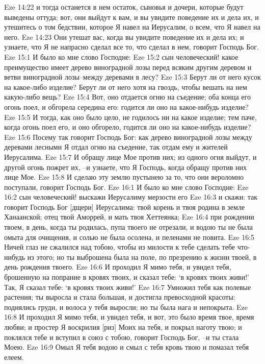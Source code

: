 Eze 14:22  и тогда останется в нем остаток, сыновья и дочери, которые будут выведены оттуда; вот, они выйдут к вам, и вы увидите поведение их и дела их, и утешитесь о том бедствии, которое Я навел на Иерусалим, о всем, что Я навел на него.
Eze 14:23  Они утешат вас, когда вы увидите поведение их и дела их; и узнаете, что Я не напрасно сделал все то, что сделал в нем, говорит Господь Бог.
Eze 15:1  И было ко мне слово Господне:
Eze 15:2  сын человеческий! какое преимущество имеет дерево виноградной лозы перед всяким другим деревом и ветви виноградной лозы--между деревами в лесу?
Eze 15:3  Берут ли от него кусок на какое-либо изделие? Берут ли от него хотя на гвоздь, чтобы вешать на нем какую-либо вещь?
Eze 15:4  Вот, оно отдается огню на съедение; оба конца его огонь поел, и обгорела середина его: годится ли оно на какое-нибудь изделие?
Eze 15:5  И тогда, как оно было цело, не годилось ни на какое изделие; тем паче, когда огонь поел его, и оно обгорело, годится ли оно на какое-нибудь изделие?
Eze 15:6  Посему так говорит Господь Бог: как дерево виноградной лозы между деревами лесными Я отдал огню на съедение, так отдам ему и жителей Иерусалима.
Eze 15:7  И обращу лице Мое против них; из одного огня выйдут, и другой огонь пожрет их, --и узнаете, что Я Господь, когда обращу против них лице Мое.
Eze 15:8  И сделаю эту землю пустынею за то, что они вероломно поступали, говорит Господь Бог.
Eze 16:1  И было ко мне слово Господне:
Eze 16:2  сын человеческий! выскажи Иерусалиму мерзости его
Eze 16:3  и скажи: так говорит Господь Бог [дщери] Иерусалима: твой корень и твоя родина в земле Ханаанской; отец твой Аморрей, и мать твоя Хеттеянка;
Eze 16:4  при рождении твоем, в день, когда ты родилась, пупа твоего не отрезали, и водою ты не была омыта для очищения, и солью не была осолена, и пеленами не повита.
Eze 16:5  Ничей глаз не сжалился над тобою, чтобы из милости к тебе сделать тебе что-нибудь из этого; но ты выброшена была на поле, по презрению к жизни твоей, в день рождения твоего.
Eze 16:6  И проходил Я мимо тебя, и увидел тебя, брошенную на попрание в кровях твоих, и сказал тебе: `в кровях твоих живи!' Так, Я сказал тебе: `в кровях твоих живи!'
Eze 16:7  Умножил тебя как полевые растения; ты выросла и стала большая, и достигла превосходной красоты: поднялись груди, и волоса у тебя выросли; но ты была нага и непокрыта.
Eze 16:8  И проходил Я мимо тебя, и увидел тебя, и вот, это было время твое, время любви; и простер Я воскрилия [риз] Моих на тебя, и покрыл наготу твою; и поклялся тебе и вступил в союз с тобою, говорит Господь Бог, --и ты стала Моею.
Eze 16:9  Омыл Я тебя водою и смыл с тебя кровь твою и помазал тебя елеем.
